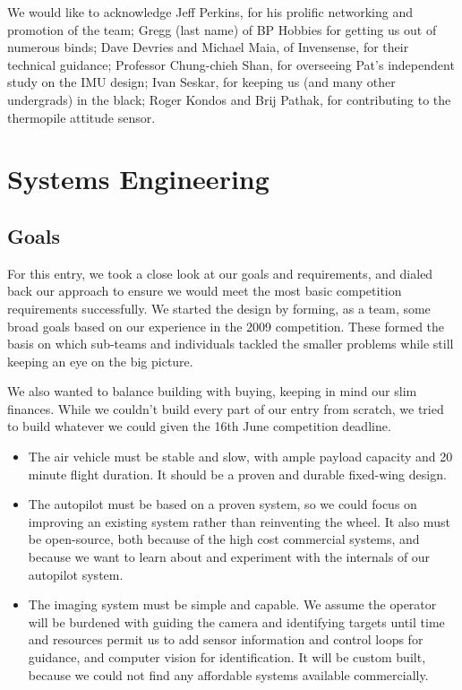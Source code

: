 \documentclass[10pt]{report}
\begin{document}
We would like to acknowledge
Jeff Perkins, for his prolific networking and promotion of the team;
Gregg (last name) of BP Hobbies for getting us out of numerous binds;
Dave Devries and Michael Maia, of Invensense, for their technical guidance;
Professor Chung-chieh Shan, for overseeing Pat's independent study on the IMU design;
Ivan Seskar, for keeping us (and many other undergrads) in the black;
Roger Kondos and Brij Pathak, for contributing to the thermopile attitude sensor.

\section{Systems Engineering}

\subsection{Goals}
For this entry, we took a close look at our goals and requirements, and dialed back our approach to ensure we would meet the most basic competition requirements successfully.
We started the design by forming, as a team, some broad goals based on our experience in the 2009 competition.
These formed the basis on which sub-teams and individuals tackled the smaller problems while still keeping an eye on the big picture. 

We also wanted to balance building with buying, keeping in mind our slim finances. While we couldn't build every part of our entry from scratch, we tried to build whatever we could given the 16th June competition deadline.



\begin{itemize}
	\item The air vehicle must be stable and slow, with ample payload capacity and 20 minute flight duration. It should be a proven and durable fixed-wing design.
	\item The autopilot must be based on a proven system, so we could focus on improving an existing system rather than reinventing the wheel. It also must be open-source, both because of the high cost commercial systems, and because we want to learn about and experiment with the internals of our autopilot system.
	\item The imaging system must be simple and capable. We assume the operator will be burdened with guiding the camera and identifying targets until time and resources permit us to add sensor information and control loops for guidance, and computer vision for identification. It will be custom built, because we could not find any affordable systems available commercially.
\end{itemize}
\end{document}

